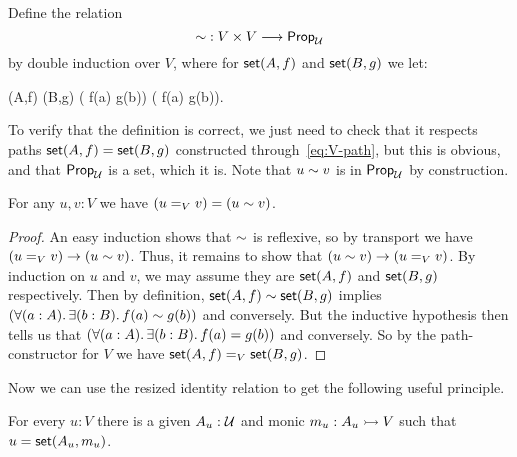 \begin{defn}\label{def:bisimulation}
  Define the 
  relation
  \begin{equation*}
    \mathord{\sim} : V \times V \longrightarrow \mathsf{Prop}_{\mathcal{U}}
  \end{equation*}
  by double induction over $V$, where for $\mathsf{set}(A,f)$ and $\mathsf{set}(B,g)$ we let:
  \begin{narrowmultline*}
    \vset(A,f)  \bisim \vset(B,g)  \narrowbreak
    \big( f(a)  \bisim g(b)\big) \land
    \big( f(a) \bisim g(b)\big).
  \end{narrowmultline*}
\end{defn}
%
To verify that the definition is correct, we just need to check that it respects paths $\mathsf{set}(A, f) = \mathsf{set}(B, g)$ constructed through~\eqref{eq:V-path}, but this is obvious, and that $\mathsf{Prop}_{\mathcal{U}}$ is a set, which it is.  Note that $u \sim v$ is in $\mathsf{Prop}_\mathcal{U}$ by construction.

\begin{lem}\label{lem:BisimEqualsId}
For any $u,v:V$ we have $(u=_V v) = (u \sim v)$.
\end{lem}

\begin{proof}
An easy induction shows that $\sim$ is reflexive, so by transport we have $(u=_V v)\to (u \sim v)$.
Thus, it remains to show that $(u \sim v)\to (u=_V v)$.
By induction on $u$ and $v$, we may assume they are $\mathsf{set}(A,f)$ and $\mathsf{set}(B,g)$ respectively.
Then by definition, $\mathsf{set}(A,f)\sim\mathsf{set}(B,g)$ implies $(\fall{a:A}\exis{b:B}f(a)  \bisim g(b))$ and conversely.
But the inductive hypothesis then tells us that $(\fall{a:A}\exis{b:B}f(a) = g(b))$ and conversely.
So by the path-con\-struc\-tor for $V$ we have $\mathsf{set}(A,f) =_V \mathsf{set}(B,g)$.
\end{proof}

Now we can use the resized identity relation to get the following useful principle.

\begin{lem}\label{lem:MonicSetPresent}
For every $u:V$ there is a given $A_u:\mathcal{U}$ and monic $m_u: A_u \rightarrowtail V$ such that $u = \mathsf{set}(A_u, m_u)$.
\end{lem}

